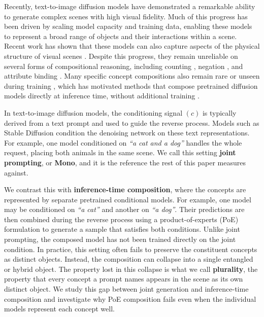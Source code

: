 \documentclass{article} %
\begin{document}
Recently, text-to-image diffusion models \citep{saharia2022photorealistic, podell2023sdxl} have demonstrated a remarkable ability to generate complex scenes with high visual fidelity. Much of this progress has been driven by scaling model capacity and training data, enabling these models to represent a broad range of objects and their interactions within a scene. Recent work has shown that these models can also capture aspects of the physical structure of visual scenes \citep{chen2023beyond, du2024generative}. Despite this progress, they remain unreliable on several forms of compositional reasoning, including counting \citep{huang2025t2icompbench}, negation \citep{conwell2024relations}, and attribute binding \citep{huang2025t2icompbench}. Many specific concept compositions also remain rare or unseen during training \citep{du2024compositional}, which has motivated methods that compose pretrained diffusion models directly at inference time, without additional training \citep{liu2022compositional}.

In text-to-image diffusion models, the conditioning signal $(c)$ is typically derived from a text prompt and used to guide the reverse process. Models such as Stable Diffusion \citep{rombach2022high} condition the denoising network on these text representations. For example, one model conditioned on \textit{``a cat and a dog''} handles the whole request, placing both animals in the same scene. We call this setting \textbf{joint prompting}, or \textbf{Mono}, and it is the reference the rest of this paper measures against.

We contrast this with \textbf{inference-time composition}, where the concepts are represented by separate pretrained conditional models. For example, one model may be conditioned on \textit{``a cat''} and another on \textit{``a dog''}. Their predictions are then combined during the reverse process using a product-of-experts (PoE) formulation \citep{liu2022compositional, zhang2025product} to generate a sample that satisfies both conditions. Unlike joint prompting, the composed model has not been trained directly on the joint condition. In practice, this setting often fails to preserve the constituent concepts as distinct objects. Instead, the composition can collapse into a single entangled or hybrid object. The property lost in this collapse is what we call \textbf{plurality}, the property that every concept a prompt names appears in the scene as its own distinct object. We study this gap between joint generation and inference-time composition and investigate why PoE composition fails even when the individual models represent each concept well.
\end{document}
